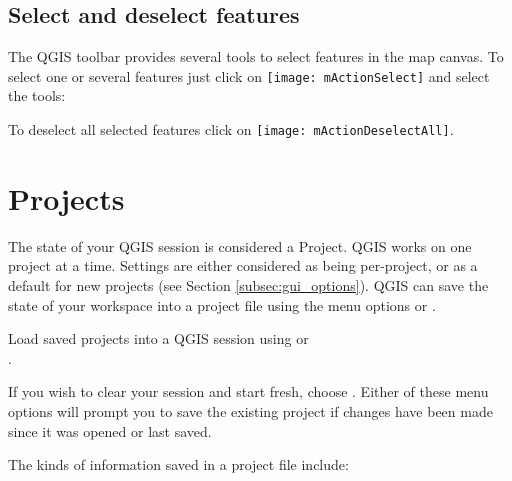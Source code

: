 \subsection{Select and deselect features}\label{sec:selection}

The QGIS toolbar provides several tools to select features in the map canvas. 
To select one or several features just click on 
\texttt{[image: mActionSelect]} and select the tools:

\begin{description}
\item {}
\item {}
\item {}
\item {}
\item {}
\end{description} 

To deselect all selected features click on \texttt{[image: mActionDeselectAll]}.

\section{Projects}\label{sec:projects}

The state of your QGIS session is considered a Project.  QGIS
works on one project at a time.  Settings are either considered
as being per-project, or as a default for new projects (see
Section \ref{subsec:gui_options}). QGIS can save the state of your
workspace into a project file using the menu options
 \arrow {}
or  \arrow {}.

Load saved projects into a QGIS session using
 \arrow {}
or  \arrow \\
.

If you wish to clear your session and start fresh, choose
 \arrow {}.
Either of these menu options will prompt you to save the existing project
if changes have been made since it was opened or last saved.

The kinds of information saved in a project file include:

